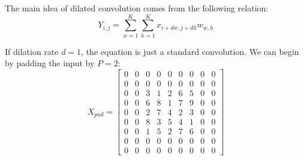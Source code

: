 \documentclass{article}
\begin{document}
{\color{blue}
The main idea of dilated convolution comes from the following relation:
\begin{equation}
    Y_{i,j}=\sum_{w=1}^K \sum_{h=1}^K x_{i+dw,j+dh}w_{w,h}
\end{equation}

If dilation rate $d= 1$, the equation is just a standard convolution. We can begin by padding the input by $P=2$:
\begin{equation}
    X_{pad}=
    \begin{bmatrix}
        0&0&0&0&0&0&0&0&0\\
        0&0&0&0&0&0&0&0&0\\
        0&0&3&1&2&6&5&0&0\\
        0&0&6&8&1&7&9&0&0\\
        0&0&2&7&4&2&3&0&0\\
        0&0&8&3&5&4&1&0&0\\
        0&0&1&5&2&7&6&0&0\\
        0&0&0&0&0&0&0&0&0\\
        0&0&0&0&0&0&0&0&0
    \end{bmatrix}
\end{equation}

}
\end{document}
